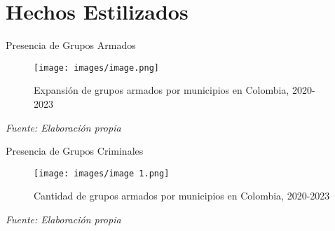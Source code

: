 \section{Hechos Estilizados}

\begin{frame}{Presencia de Grupos Armados}
    \begin{figure}[ht]
        \centering
        \texttt{[image: images/image.png]}
        \caption{\footnotesize Expansión de grupos armados por municipios en Colombia, 2020-2023}
    \end{figure}

    \centering
    \footnotesize\textit{Fuente: Elaboración propia}
\end{frame}

\begin{frame}{Presencia de Grupos Criminales}
    \begin{figure}[ht]
        \centering
        \texttt{[image: images/image 1.png]}
        \caption{\footnotesize Cantidad de grupos armados por municipios en Colombia, 2020-2023}
    \end{figure}

    \centering
    \footnotesize\textit{Fuente: Elaboración propia}
\end{frame}


